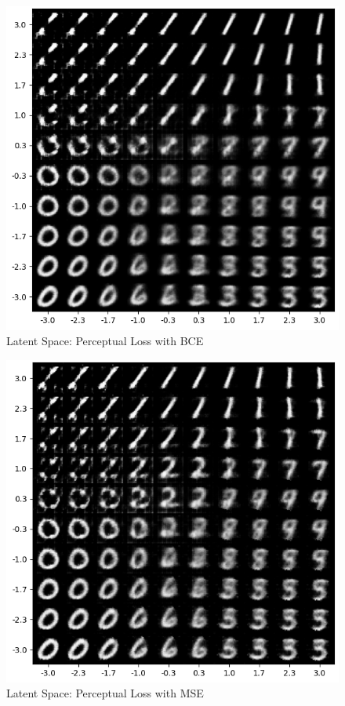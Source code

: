 \documentclass[12pt]{article}
\begin{document}
\begin{figure}[h]
\centering
\includegraphics[width=1\linewidth]{report_images/percep_bce/latent_space.png}
\caption{\label{fig:latent_percep_bce}Latent Space: Perceptual Loss with BCE}
\end{figure}

\begin{figure}[h]
\centering
\includegraphics[width=1\linewidth]{report_images/percep_mse/latent_space.png}
\caption{\label{fig:latent_percep_mse}Latent Space: Perceptual Loss with MSE}
\end{figure}
\end{document}
